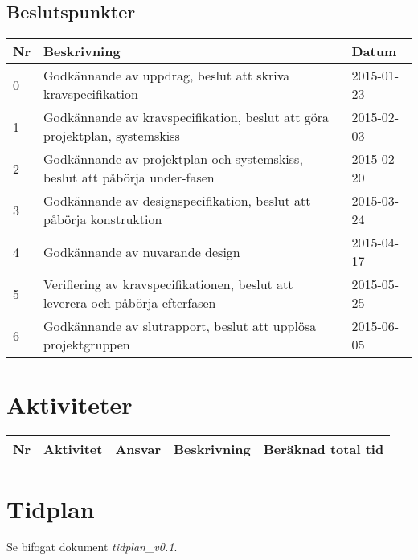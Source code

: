 \documentclass[11pt]{article}
\begin{document}
\begin{flushleft}
\begin{table}[h]
\begin{tabular}{|l|p{.75\linewidth}|l|}
\end{tabular}
\end{table}

\subsection{Beslutspunkter}
\begin{table}[h]
\begin{tabular}{|l|p{.75\linewidth}|l|} \hline

Nr &
Beskrivning &
Datum \\ \hline

0 &
Godkännande av uppdrag, beslut att skriva kravspecifikation &
2015-01-23 \\ \hline
1 &
Godkännande av kravspecifikation, beslut att göra projektplan, systemskiss &
2015-02-03 \\ \hline
2 &
Godkännande av projektplan och systemskiss, beslut att påbörja under-fasen &
2015-02-20 \\ \hline
3 &
Godkännande av designspecifikation, beslut att påbörja konstruktion &
2015-03-24 \\ \hline
4 &
Godkännande av nuvarande design &
2015-04-17 \\ \hline
5 &
Verifiering av kravspecifikationen, beslut att leverera och påbörja efterfasen &
2015-05-25 \\ \hline
6 &
Godkännande av slutrapport, beslut att upplösa projektgruppen &
2015-06-05 \\ \hline
 
\end{tabular}
\end{table}

\pagebreak

\section{Aktiviteter}
\begin{table}[h]
\begin{tabular}{|l|p{.30\linewidth}|l|p{.40\linewidth}|p{.10\linewidth}|} \hline

Nr & 
Aktivitet & 
Ansvar & 
Beskrivning & 
Beräknad total tid \\[0.1in] \hline




\end{tabular}
\end{table}


\section{Tidplan}
Se bifogat dokument \textit{tidplan\_v0.1}.


\end{flushleft}
\end{document}
